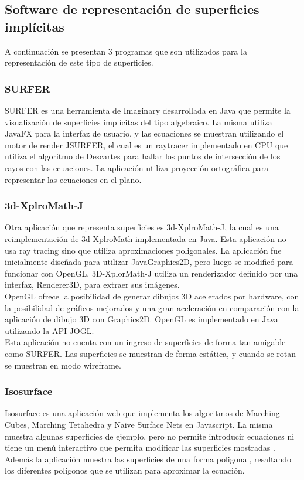 \documentclass[12pt]{article}
\begin{document}
\subsection{Software de representación de superficies implícitas}
A continuación se presentan 3 programas que son utilizados para la representación de este tipo de superficies.
\subsubsection{SURFER}
SURFER es una herramienta de Imaginary desarrollada en Java que permite la visualización de superficies implícitas del tipo algebraico. La misma utiliza JavaFX para la interfaz de usuario, y las ecuaciones se muestran utilizando el motor de render JSURFER, el cual es un raytracer implementado en CPU que utiliza el algoritmo de Descartes para hallar los puntos de intersección de los rayos con las ecuaciones. La aplicación utiliza proyección ortográfica para representar las ecuaciones en el plano.
\subsubsection{3d-XplroMath-J}
Otra aplicación que representa superficies es 3d-XplroMath-J, la cual es una reimplementación de 3d-XplroMath implementada en Java. Esta aplicación no usa ray tracing sino que utiliza aproximaciones poligonales. La aplicación fue inicialmente diseñada para utilizar JavaGraphics2D, pero luego se modificó para funcionar con OpenGL. 3D-XplorMath-J utiliza un  renderizador definido por una interfaz, Renderer3D, para extraer sus imágenes. 
\\OpenGL ofrece la posibilidad de generar dibujos 3D acelerados por hardware, con la posibilidad de gráficos mejorados y una gran aceleración en comparación con la aplicación de dibujo 3D con Graphics2D. OpenGL es implementado en Java utilizando la API JOGL.
\\Esta aplicación no cuenta con un ingreso de superficies de forma tan amigable como SURFER. Las superficies se muestran de forma estática, y cuando se rotan se muestran en modo wireframe.
\subsubsection{Isosurface}
Isosurface es una aplicación web que implementa los algoritmos de Marching Cubes, Marching Tetahedra y Naive Surface Nets en Javascript. La misma muestra algunas superficies de ejemplo, pero no permite introducir ecuaciones ni tiene un menú interactivo que permita modificar las superficies mostradas . Además la aplicación muestra las superficies de una forma poligonal, resaltando los diferentes polígonos que se utilizan para aproximar la ecuación.  
\end{document}
